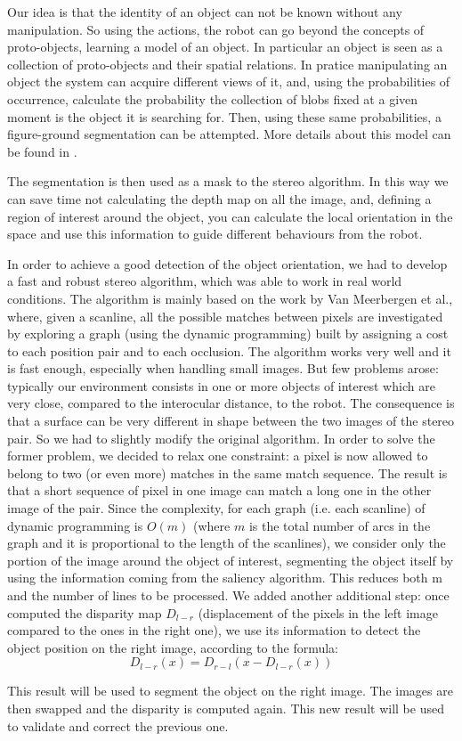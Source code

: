 Our idea is that the identity of an object can not be known without any manipulation. So using the actions, the robot can go beyond the concepts of proto-objects, learning a model of an object. In particular an object is seen as a collection of proto-objects and their spatial relations. In pratice manipulating an object the system can acquire different views of it, and, using the probabilities of occurrence, calculate the probability the collection of blobs fixed at a given moment is the object it is searching for. Then, using these same probabilities, a figure-ground segmentation can be attempted. More details about this model can be found in \cite{orabona05object}.

The segmentation is then used as a mask to the stereo algorithm. In this way we can save time not calculating the depth map on all the image, and, defining a region of interest around the object, you can calculate the local orientation in the space and use this information to guide different behaviours from the robot.

In order to achieve a good detection of the object orientation, we had to develop a fast and robust stereo algorithm, which was able to work in real world conditions.
The algorithm is mainly based on the work by Van Meerbergen et al.,  where, given a scanline, all the possible matches between pixels are investigated by exploring a graph (using the dynamic programming) built by assigning a cost to each position pair and to each occlusion. The algorithm works very well and it is fast enough, especially when handling small images. But few problems arose: typically our environment consists in one or more objects of interest which are very close, compared to the interocular distance, to the robot. The consequence is that a surface can be very different in shape between the two images of the stereo pair. So we had to slightly modify the original algorithm. In order to solve the former problem, we decided to relax one constraint: a pixel is now allowed to belong to two (or even more) matches in the same match sequence. The result is that a short sequence of pixel in one image can match a long one in the other image of the pair. 
Since the complexity, for each graph (i.e. each scanline) of dynamic programming is $O(m)$ (where $m$ is the total number of arcs in the graph and it is proportional to the length of the scanlines), we consider only the portion of the image around the object of interest, segmenting the object itself by using the information coming from the saliency algorithm. This reduces both m and the number of  lines to be processed.
We added another additional step: once computed the disparity map $D_{l-r}$ (displacement of the pixels in the left image compared to the ones in the right one), we use its information to detect the object position on the right image, according to the formula: 
\begin{equation}D_{l-r}(x)=D_{r-l}(x-D_{l-r}(x))\end{equation}

This result will be used to segment the object on the right image. The images are then swapped and the disparity is computed again. This new result will be used to validate and correct the previous one.